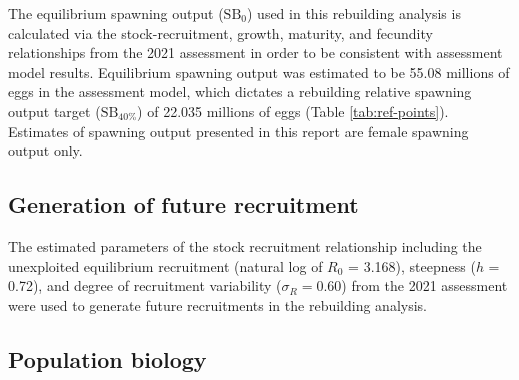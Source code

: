 \documentclass[11pt,
  english,
  a4paper,
]{article}
\begin{document}
\leavevmode\tagmcend\tagstructend


The equilibrium spawning output ({\(\text{SB}_0\)\leavevmode\tagmcend\tagstructend}) used in this rebuilding analysis is calculated via the stock-recruitment, growth, maturity, and fecundity relationships from the 2021 assessment in order to be consistent with assessment model results. Equilibrium spawning output was estimated to be 55.08 millions of eggs in the assessment model, which dictates a rebuilding relative spawning output target ({\(\text{SB}_{40\%}\)\leavevmode\tagmcend\tagstructend}) of 22.035 millions of eggs (Table \ref{tab:ref-points}). Estimates of spawning output presented in this report are female spawning output only.

\leavevmode\tagmcend\tagstructend\par


\hypertarget{generation-of-future-recruitment}{%
\subsection{Generation of future recruitment}\label{generation-of-future-recruitment}}

\leavevmode\tagmcend\tagstructend


The estimated parameters of the stock recruitment relationship including the unexploited equilibrium recruitment (natural log of {\(R_0\)\leavevmode\tagmcend\tagstructend} = 3.168), steepness ({\(h\)\leavevmode\tagmcend\tagstructend} = 0.72), and degree of recruitment variability ({\(\sigma_R = 0.60\)\leavevmode\tagmcend\tagstructend}) from the 2021 assessment were used to generate future recruitments in the rebuilding analysis.

\leavevmode\tagmcend\tagstructend\par


\hypertarget{population-biology}{%
\subsection{Population biology}\label{population-biology}}
\end{document}

